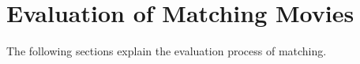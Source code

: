 \section{Evaluation of Matching Movies}
\label{sec_evaluation}

The following sections explain the evaluation process of matching.


%